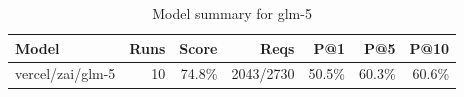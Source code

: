 \begin{table}[htbp]
\centering
\begin{tabular}{lrrrrrr}
\toprule
Model & Runs & Score & Reqs & P@1 & P@5 & P@10 \\
\midrule
vercel/zai/glm-5 & 10 & 74.8\% & 2043/2730 & 50.5\% & 60.3\% & 60.6\% \\
\bottomrule
\end{tabular}
\caption{Model summary for glm-5}
\end{table}
